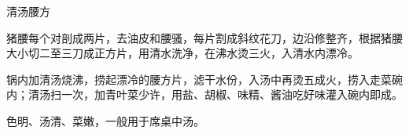 %
%
%
%
%
%
%
\begin{recipe}{清汤腰方}

\ingredients


\preparation

\step 猪腰每个对剖成两片，去油皮和腰骚，每片割成斜纹花刀，边沿修整齐，根据猪腰
大小切二至三刀成正方片，用清水洗净，在沸水烫三火，入清水内漂冷。

\step 锅内加清汤烧沸，捞起漂冷的腰方片，滤干水份，入汤中再烫五成火，捞入走菜碗
内；清汤扫一次，加青叶菜少许，用盐、胡椒、味精、酱油吃好味灌入碗内即成。

\features

色明、汤清、菜嫩，一般用于席桌中汤。

\end{recipe}


